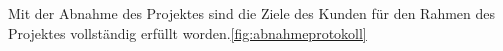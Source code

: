 Mit der Abnahme des Projektes sind die Ziele des Kunden für den Rahmen des Projektes vollständig erfüllt worden.\ref{fig:abnahmeprotokoll}